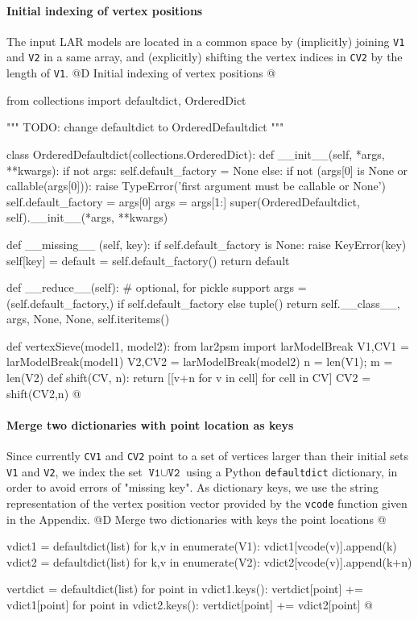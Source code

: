 \documentclass[11pt,oneside]{article}	%
\begin{document}
\paragraph{Initial indexing of vertex positions}
The input LAR models are located in a common space by (implicitly) joining \texttt{V1} and \texttt{V2} in a same array, and (explicitly) shifting the vertex indices in \texttt{CV2} by the length of \texttt{V1}.
@D Initial indexing of vertex positions
@{from collections import defaultdict, OrderedDict

""" TODO: change defaultdict to OrderedDefaultdict """

class OrderedDefaultdict(collections.OrderedDict):
    def __init__(self, *args, **kwargs):
        if not args:
            self.default_factory = None
        else:
            if not (args[0] is None or callable(args[0])):
                raise TypeError('first argument must be callable or None')
            self.default_factory = args[0]
            args = args[1:]
        super(OrderedDefaultdict, self).__init__(*args, **kwargs)

    def __missing__ (self, key):
        if self.default_factory is None:
            raise KeyError(key)
        self[key] = default = self.default_factory()
        return default

    def __reduce__(self):  # optional, for pickle support
        args = (self.default_factory,) if self.default_factory else tuple()
        return self.__class__, args, None, None, self.iteritems()


def vertexSieve(model1, model2):
	from lar2psm import larModelBreak
	V1,CV1 = larModelBreak(model1) 
	V2,CV2 = larModelBreak(model2)
	n = len(V1); m = len(V2)
	def shift(CV, n): 
		return [[v+n for v in cell] for cell in CV]
	CV2 = shift(CV2,n)
@}

\paragraph{Merge two dictionaries with point location as keys}
Since currently \texttt{CV1} and \texttt{CV2} point to a set of vertices larger than their initial sets 
\texttt{V1} and \texttt{V2}, we index the set $\texttt{V1} \cup \texttt{V2}$ using a Python \texttt{defaultdict} dictionary, in order to avoid errors of "missing key". As dictionary keys, we use the string representation of the vertex position vector provided by the \texttt{vcode} function given in the Appendix.
@D Merge two dictionaries with keys the point locations
@{	vdict1 = defaultdict(list)
	for k,v in enumerate(V1): vdict1[vcode(v)].append(k) 
	vdict2 = defaultdict(list)
	for k,v in enumerate(V2): vdict2[vcode(v)].append(k+n) 
	
	vertdict = defaultdict(list)
	for point in vdict1.keys(): vertdict[point] += vdict1[point]
	for point in vdict2.keys(): vertdict[point] += vdict2[point]
@}
\end{document}
